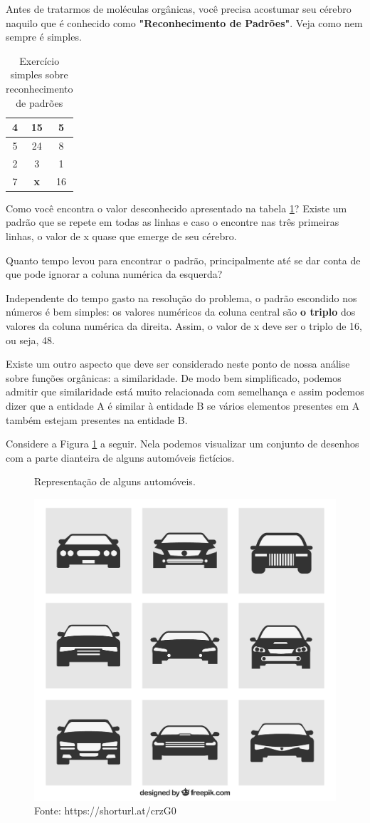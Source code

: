 Antes de tratarmos de moléculas orgânicas, você precisa acostumar seu cérebro naquilo que é conhecido como \textbf{"Reconhecimento de Padrões"}. Veja como nem sempre é simples.

\begin{table}[!h]
	\begin{center}
	\caption{\label{padroes}Exercício simples sobre reconhecimento de padrões}
	\vspace{0.5cm}
	\begin{tabular}{|c | c | c|}
	\hline
	4 & 15 & 5\\
	\hline
	5 & 24 & 8\\
    \hline
	2 & 3 & 1\\
	\hline
    7 & \textbf{x} & 16\\
    \hline
	\end{tabular}
	\end{center}
\end{table}

Como você encontra o valor desconhecido apresentado na tabela \ref{padroes}? Existe um padrão que se repete em todas as linhas e caso o encontre nas três primeiras linhas, o valor de x quase que emerge de seu cérebro. 

Quanto tempo levou para encontrar o padrão, principalmente até se dar conta de que pode ignorar a coluna numérica da esquerda?

Independente do tempo gasto na resolução do problema, o padrão escondido nos números é bem simples: os valores numéricos da coluna central são \textbf{o triplo} dos valores da coluna numérica da direita. Assim, o valor de x deve ser o triplo de 16, ou seja, 48.

Existe um outro aspecto que deve ser considerado neste ponto de nossa análise sobre funções orgânicas: a similaridade. De modo bem simplificado, podemos admitir que similaridade está muito relacionada com semelhança e assim podemos dizer que a entidade A é similar à entidade B se vários elementos presentes em A também estejam presentes na entidade B.

Considere a Figura \ref{fig:carros} a seguir. Nela podemos visualizar um conjunto de desenhos com a parte dianteira de alguns automóveis fictícios.

\begin{figure}[h]
	\centering
	\caption{Representação de alguns automóveis.}
	\vspace{0.5cm}
	\includegraphics[width=0.5\linewidth]{imagens/19035-NRYBNX.jpg}
    \caption*{Fonte: https://shorturl.at/crzG0}
	\label{fig:carros}
\end{figure}


